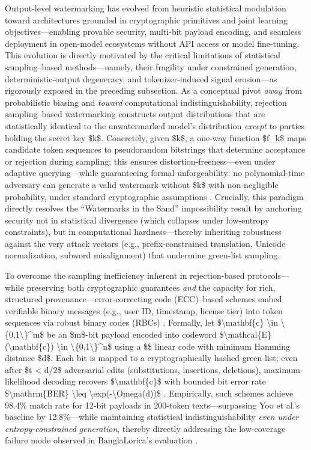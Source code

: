 \documentclass[11pt,a4paper]{article}
\begin{document}
Output-level watermarking has evolved from heuristic statistical modulation toward architectures grounded in cryptographic primitives and joint learning objectives---enabling provable security, multi-bit payload encoding, and seamless deployment in open-model ecosystems without API access or model fine-tuning. This evolution is directly motivated by the critical limitations of statistical sampling--based methods---namely, their fragility under constrained generation, deterministic-output degeneracy, and tokenizer-induced signal erosion---as rigorously exposed in the preceding subsection. As a conceptual pivot \emph{away} from probabilistic biasing and \emph{toward} computational indistinguishability, rejection sampling--based watermarking constructs output distributions that are statistically identical to the unwatermarked model's distribution \emph{except} to parties holding the secret key \$k\$. Concretely, given \$k\$, a one-way function \$f\_k\$ maps candidate token sequences to pseudorandom bitstrings that determine acceptance or rejection during sampling; this ensures distortion-freeness---even under adaptive querying---while guaranteeing formal unforgeability: no polynomial-time adversary can generate a valid watermark without \$k\$ with non-negligible probability, under standard cryptographic assumptions \cite{arxiv:2405.13517}. Crucially, this paradigm directly resolves the ``Watermarks in the Sand'' impossibility result \cite{arxiv:2405.13517} by anchoring security not in statistical divergence (which collapses under low-entropy constraints), but in computational hardness---thereby inheriting robustness against the very attack vectors (e.g., prefix-constrained translation, Unicode normalization, subword misalignment) that undermine green-list sampling.

To overcome the sampling inefficiency inherent in rejection-based protocols---while preserving both cryptographic guarantees \emph{and} the capacity for rich, structured provenance---error-correcting code (ECC)--based schemes embed verifiable binary messages (e.g., user ID, timestamp, license tier) into token sequences via robust binary codes (RBCs) \cite{arxiv:2401.16820}. Formally, let \$\textbackslash{}mathbf\{c\} \textbackslash{}in \textbackslash{}\{0,1\textbackslash{}\}\textasciicircum{}m\$ be an \$m\$-bit payload encoded into codeword \$\textbackslash{}mathcal\{E\}(\textbackslash{}mathbf\{c\}) \textbackslash{}in \textbackslash{}\{0,1\textbackslash{}\}\textasciicircum{}n\$ using a \$\cite{arxiv:2512.03620}\$ linear code with minimum Hamming distance \$d\$. Each bit is mapped to a cryptographically hashed green list; even after \$t < d/2\$ adversarial edits (substitutions, insertions, deletions), maximum-likelihood decoding recovers \$\textbackslash{}mathbf\{c\}\$ with bounded bit error rate \$\textbackslash{}mathrm\{BER\} \textbackslash{}leq \textbackslash{}exp(-\textbackslash{}Omega(d))\$ \cite{arxiv:2401.16820}. Empirically, such schemes achieve 98.4\% match rate for 12-bit payloads in 200-token texts---surpassing Yoo et al.'s baseline by 12.8\%---while maintaining statistical indistinguishability \emph{even under entropy-constrained generation}, thereby directly addressing the low-coverage failure mode observed in BanglaLorica's evaluation \cite{doi:10.1038/s41586-024-08025-4}.
\end{document}
